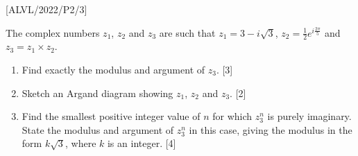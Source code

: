 \item {[}ALVL/2022/P2/3{]}

The complex numbers $z_{1}$, $z_{2}$ and $z_{3}$ are such that
$z_{1}=3-i\sqrt{3}$, $z_{2}=\frac{1}{2}e^{i\frac{2\pi}{5}}$ and
$z_{3}=z_{1}\times z_{2}$.
\begin{enumerate}
\item Find exactly the modulus and argument of $z_{3}$. \hfill{}{[}3{]}
\item Sketch an Argand diagram showing $z_{1}$, $z_{2}$ and $z_{3}$.
\hfill{}{[}2{]}
\item Find the smallest positive integer value of $n$ for which $z_{3}^{n}$
is purely imaginary. State the modulus and argument of $z_{3}^{n}$
in this case, giving the modulus in the form $k\sqrt{3}$, where $k$
is an integer. \hfill{}{[}4{]}
\end{enumerate}
